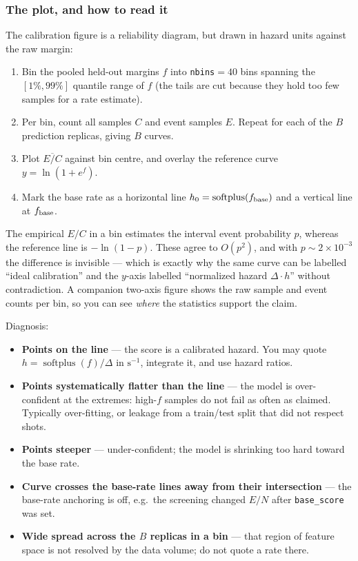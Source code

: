 \documentclass[11pt,a4paper]{article}
\newcommand{\code}[1]{\texttt{\small #1}}
\newcommand{\softplus}{\operatorname{softplus}}
\begin{document}
\subsubsection*{The plot, and how to read it}

The calibration figure is a reliability diagram, but drawn in hazard units against the raw margin:

\begin{enumerate}[leftmargin=2em]
\item Bin the pooled held-out margins $f$ into \code{nbins}$=40$ bins spanning the
$[1\%, 99\%]$ quantile range of $f$ (the tails are cut because they hold too few samples for a rate
estimate).
\item Per bin, count all samples $C$ and event samples $E$. Repeat for each of the $B$ prediction
replicas, giving $B$ curves.
\item Plot $\overline{E/C}$ against bin centre, and overlay the reference curve
$y = \ln(1+e^{f})$.
\item Mark the base rate as a horizontal line $h_0 = \softplus(f_{\rm base})$ and a vertical line at
$f_{\rm base}$.
\end{enumerate}

The empirical $E/C$ in a bin estimates the interval event probability $p$, whereas the reference
line is $-\ln(1-p)$. These agree to $O(p^2)$, and with $p \sim 2\times 10^{-3}$ the difference is
invisible --- which is exactly why the same curve can be labelled ``ideal calibration'' and the
$y$-axis labelled ``normalized hazard $\Delta \cdot h$'' without contradiction. A companion
two-axis figure shows the raw sample and event counts per bin, so you can see \emph{where} the
statistics support the claim.

\medskip
\noindent Diagnosis:
\begin{itemize}[leftmargin=2em,noitemsep]
\item \textbf{Points on the line} --- the score is a calibrated hazard. You may quote
$h = \softplus(f)/\Delta$ in $\mathrm{s}^{-1}$, integrate it, and use hazard ratios.
\item \textbf{Points systematically flatter than the line} --- the model is over-confident at the
extremes: high-$f$ samples do not fail as often as claimed. Typically over-fitting, or leakage from
a train/test split that did not respect shots.
\item \textbf{Points steeper} --- under-confident; the model is shrinking too hard toward the base
rate.
\item \textbf{Curve crosses the base-rate lines away from their intersection} --- the base-rate
anchoring is off, e.g.\ the screening changed $E/N$ after \code{base\_score} was set.
\item \textbf{Wide spread across the $B$ replicas in a bin} --- that region of feature space is not
resolved by the data volume; do not quote a rate there.
\end{itemize}
\end{document}
